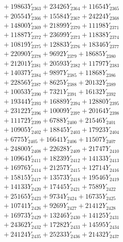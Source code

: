 \documentclass[a4paper,10pt]{article}
\begin{document}
{\begin{align}
&\;  + 19863 Y_{2363} + 23426 Y_{2364} + 11654 Y_{2365} \\[0.3ex]
&\;  + 20554 Y_{2366} + 15584 Y_{2367} + 24224 Y_{2368} \\[0.5ex]\allowbreak
&\;  + 14800 Y_{2369} + 21899 Y_{2370} + 11198 Y_{2371} \\[0.3ex]
&\;  + 11887 Y_{2372} + 23699 Y_{2373} + 11838 Y_{2374} \\[0.3ex]
&\;  + 10819 Y_{2375} + 12883 Y_{2376} + 18346 Y_{2377} \\[0.3ex]
&\;  + 22090 Y_{2378} + 9692 Y_{2379} + 18685 Y_{2380} \\[0.3ex]
&\;  + 21201 Y_{2381} + 20593 Y_{2382} + 11797 Y_{2383} \\[0.3ex]
&\;  + 14037 Y_{2384} + 9897 Y_{2385} + 11868 Y_{2386} \\[0.3ex]
&\;  + 22856 Y_{2387} + 8625 Y_{2388} + 20132 Y_{2389} \\[0.3ex]
&\;  + 10053 Y_{2390} + 7321 Y_{2391} + 16132 Y_{2392} \\[0.3ex]
&\;  + 19344 Y_{2393} + 16889 Y_{2394} + 12880 Y_{2395} \\[0.3ex]
&\;  + 23122 Y_{2396} + 10009 Y_{2397} + 20164 Y_{2398} \\[0.5ex]\allowbreak
&\;  + 11172 Y_{2399} + 6788 Y_{2400} + 21546 Y_{2401} \\[0.3ex]
&\;  + 10905 Y_{2402} + 18845 Y_{2403} + 17923 Y_{2404} \\[0.3ex]
&\;  + 6775 Y_{2405} + 16641 Y_{2406} + 11507 Y_{2407} \\[0.3ex]
&\;  + 24800 Y_{2408} + 22628 Y_{2409} + 21747 Y_{2410} \\[0.3ex]
&\;  + 10964 Y_{2411} + 18239 Y_{2412} + 14133 Y_{2413} \\[0.3ex]
&\;  + 16976 Y_{2414} + 21257 Y_{2415} + 12714 Y_{2416} \\[0.3ex]
&\;  + 15815 Y_{2417} + 13573 Y_{2418} + 19546 Y_{2419} \\[0.3ex]
&\;  + 14133 Y_{2420} + 17445 Y_{2421} + 7589 Y_{2422} \\[0.3ex]
&\;  + 25165 Y_{2423} + 9734 Y_{2424} + 16735 Y_{2425} \\[0.3ex]
&\;  + 10741 Y_{2426} + 9269 Y_{2427} + 21412 Y_{2428} \\[0.5ex]\allowbreak
&\;  + 16973 Y_{2429} + 13246 Y_{2430} + 14125 Y_{2431} \\[0.3ex]
&\;  + 24362 Y_{2432} + 17282 Y_{2433} + 14595 Y_{2434} \\[0.3ex]
&\;  + 24124 Y_{2435} + 25233 Y_{2436} + 21432 Y_{2437} \\[0.3ex]

\end{align}}
\end{document}
